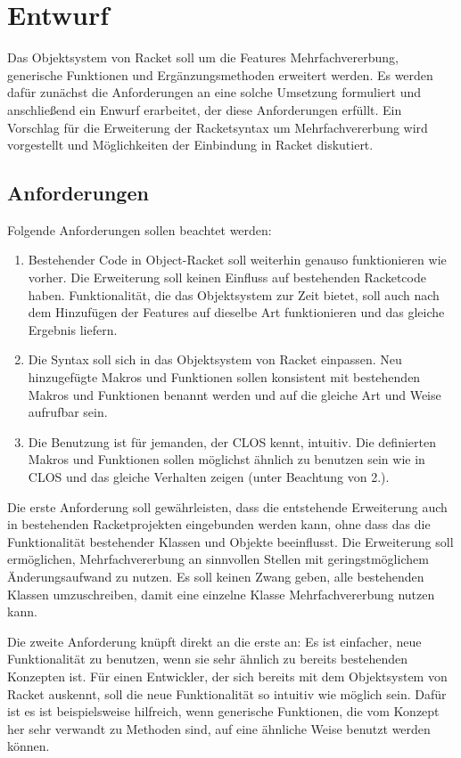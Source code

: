 \chapter{Entwurf} 
Das Objektsystem von Racket soll um die Features Mehrfachvererbung, generische Funktionen und Ergänzungsmethoden erweitert werden. Es werden dafür zunächst die Anforderungen an eine solche Umsetzung formuliert und anschließend ein Enwurf erarbeitet, der diese Anforderungen erfüllt. Ein Vorschlag für die Erweiterung der Racketsyntax um Mehrfachvererbung wird vorgestellt und Möglichkeiten der Einbindung in Racket diskutiert.

\section{Anforderungen}
Folgende Anforderungen sollen beachtet werden:
\begin{enumerate}
 \item Bestehender Code in Object-Racket soll weiterhin genauso funktionieren wie vorher. Die Erweiterung soll keinen Einfluss auf bestehenden Racketcode haben. Funktionalität, die das Objektsystem zur Zeit bietet, soll auch nach dem Hinzufügen der Features auf dieselbe Art funktionieren und das gleiche Ergebnis liefern.
 \item Die Syntax soll sich in das Objektsystem von Racket einpassen. Neu hinzugefügte Makros und Funktionen sollen konsistent mit bestehenden Makros und Funktionen benannt werden und auf die gleiche Art und Weise aufrufbar sein. 
 \item Die Benutzung ist für jemanden, der CLOS kennt, intuitiv. Die definierten Makros und Funktionen sollen möglichst ähnlich zu benutzen sein wie in CLOS und das gleiche Verhalten zeigen (unter Beachtung von 2.).
\end{enumerate}

Die erste Anforderung soll gewährleisten, dass die entstehende Erweiterung auch in bestehenden Racketprojekten eingebunden werden kann, ohne dass das die Funktionalität bestehender Klassen und Objekte beeinflusst. Die Erweiterung soll ermöglichen, Mehrfachvererbung an sinnvollen Stellen mit geringstmöglichem Änderungsaufwand zu nutzen. Es soll keinen Zwang geben, alle bestehenden Klassen umzuschreiben, damit eine einzelne Klasse Mehrfachvererbung nutzen kann.

Die zweite Anforderung knüpft direkt an die erste an: Es ist einfacher, neue Funktionalität zu benutzen, wenn sie sehr ähnlich zu bereits bestehenden Konzepten ist. Für einen Entwickler, der sich bereits mit dem Objektsystem von Racket auskennt, soll die neue Funktionalität so intuitiv wie möglich sein. Dafür ist es ist beispielsweise hilfreich, wenn generische Funktionen, die vom Konzept her sehr verwandt zu Methoden sind, auf eine ähnliche Weise benutzt werden können.

